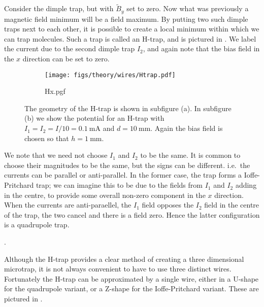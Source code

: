 
Consider the dimple trap, but with $\tilde{B}_y$ set to zero. Now what was
previously a magnetic field minimum will be a field maximum. By putting two
such dimple traps next to each other, it is possible to create a local minimum
within which we can trap molecules. Such a trap is called an H-trap, and is
pictured in . We label the current due to the second
dimple trap $I_2$, and again note that the bias field in the $x$ direction can
be set to zero. 

\begin{figure}[htb]
  \centering
  \begin{subfigure}[b]{0.4\textwidth}
    \texttt{[image: figs/theory/wires/Htrap.pdf]}
  \end{subfigure}
  \begin{subfigure}[b]{0.4\textwidth}
    {Hx.pgf}
  \end{subfigure}
  \caption{The geometry of the H-trap is shown in subfigure (a). In subfigure
  (b) we show the potential for an H-trap with
  $I_1=I_2=I/10=\SI{0.1}{\milli\ampere}$ and $d=\SI{10}{\milli\meter}$. Again the bias field is chosen so
  that $h=\SI{1}{\milli\meter}$.}
  \label{theory:fig:Htrap}
\end{figure}

We note that we need not choose $I_1$ and $I_2$ to be the same. It is common to
choose their magnitudes to be the same, but the signs can be different. i.e.\
the currents can be parallel or anti-parallel. In the former case, the trap
forms a Ioffe-Pritchard trap; we can imagine this to be due to the fields from
$I_1$ and $I_2$ adding in the centre, to provide some overall non-zero
component in the $x$ direction. When the currents are anti-paraellel, the $I_1$
field opposes the $I_2$ field in the centre of the trap, the two cancel and
there is a field zero. Hence the latter configuration is a quadrupole trap.

.

Although the H-trap provides a clear method of creating a three dimensional
microtrap, it is not always convenient to have to use three distinct wires.
Fortunately the H-trap can be approximated by a single wire, either in a
U-shape for the quadrupole variant, or a Z-shape for the Ioffe-Pritchard
variant. These are pictured in \cm{figure}.

